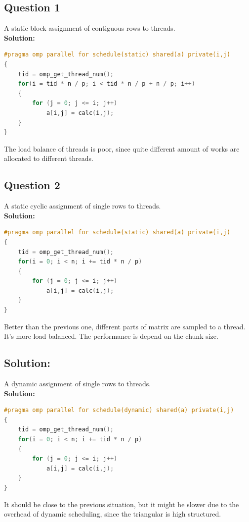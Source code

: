 \documentclass{article}
\begin{document}
\subsection{Question 1}
A static block assignment of contiguous rows to threads. 
\\\textbf{Solution: }
\begin{lstlisting}[language=c++]
#pragma omp parallel for schedule(static) shared(a) private(i,j)
{
    tid = omp_get_thread_num();
    for(i = tid * n / p; i < tid * n / p + n / p; i++)
    {
        for (j = 0; j <= i; j++) 
            a[i,j] = calc(i,j);
    }
}
\end{lstlisting}
The load balance of threads is poor, since quite different amount of works are allocated to different threads.
\subsection{Question 2}
A static cyclic assignment of single rows to threads. 
\\\textbf{Solution: }
\begin{lstlisting}[language=c++]
#pragma omp parallel for schedule(static) shared(a) private(i,j)
{
    tid = omp_get_thread_num();
    for(i = 0; i < n; i += tid * n / p)
    {
        for (j = 0; j <= i; j++) 
            a[i,j] = calc(i,j);
    }
}
\end{lstlisting}
Better than the previous one, different parts of matrix are sampled to a thread. It's more load balanced. The performance is depend on the chunk size.
\subsection{Solution: }
A dynamic assignment of single rows to threads. 
\\\textbf{Solution: }
\begin{lstlisting}[language=c++]
#pragma omp parallel for schedule(dynamic) shared(a) private(i,j)
{
    tid = omp_get_thread_num();
    for(i = 0; i < n; i += tid * n / p)
    {
        for (j = 0; j <= i; j++) 
            a[i,j] = calc(i,j);
    }
}
\end{lstlisting}
It should be close to the previous situation, but it might be slower due to the overhead of dynamic scheduling, since the triangular is high structured.
\end{document}
